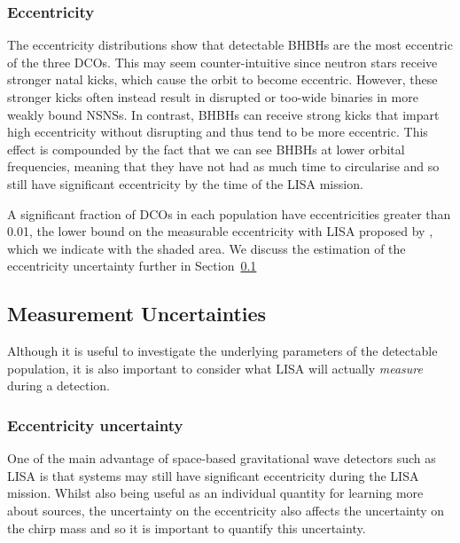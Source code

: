\subsubsection{Eccentricity}
The eccentricity distributions show that detectable BHBHs are the most eccentric of the three DCOs. This may seem counter-intuitive since neutron stars receive stronger natal kicks, which cause the orbit to become eccentric. However, these stronger kicks often instead result in disrupted or too-wide binaries in more weakly bound NSNSs. In contrast, BHBHs can receive strong kicks that impart high eccentricity without disrupting and thus tend to be more eccentric. This effect is compounded by the fact that we can see BHBHs at lower orbital frequencies, meaning that they have not had as much time to circularise and so still have significant eccentricity by the time of the LISA mission.

A significant fraction of DCOs in each population have eccentricities greater than 0.01, the lower bound on the measurable eccentricity with LISA proposed by \citet{Nishizawa+2016}, which we indicate with the shaded area. We discuss the estimation of the eccentricity uncertainty further in Section~\ref{sec:measurement_uncertainties}

\subsection{Measurement Uncertainties}\label{sec:measurement_uncertainties}
Although it is useful to investigate the underlying parameters of the detectable population, it is also important to consider what LISA will actually \textit{measure} during a detection.

\subsubsection{Eccentricity uncertainty}\label{sec:ecc_unc}
One of the main advantage of space-based gravitational wave detectors such as LISA is that systems may still have significant eccentricity during the LISA mission. Whilst also being useful as an individual quantity for learning more about sources, the uncertainty on the eccentricity also affects the uncertainty on the chirp mass and so it is important to quantify this uncertainty.

